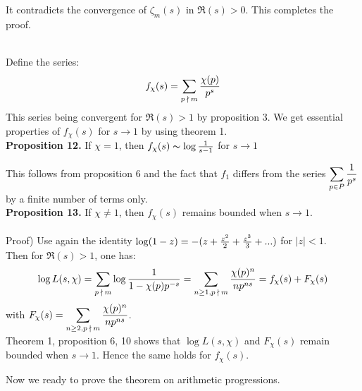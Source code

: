 \documentclass[11pt]{article}
\begin{document}
\noindent It contradicts the convergence of $\zeta_m(s)$ in $\Re(s)>0$. This completes the proof.
\\
\\
\par Define the series:
\begin{equation*}
f_{\chi}(s)=\displaystyle\sum_{p\:\nmid\: m}{\chi(p)\over p^s}
\end{equation*}
This series being convergent for $\Re(s)>1$ by proposition 3. We get essential properties of $f_{\chi}(s)$ for $s\to 1$ by using theorem 1.
\vspace{7mm}
\\
\textbf{Proposition 12.}
If $\chi=1$, then $f_{\chi}(s) \thicksim \log{1\over s-1}$ for $s\to 1$
\\
\par
This follows from proposition 6 and the fact that $f_1$ differs from the series $\displaystyle\sum_{p\in P}{1\over p^s}$ by a finite number of terms only.
\vspace{7mm}
\\
\textbf{Proposition 13.}
If $\chi\neq 1$, then $f_{\chi}(s)$ remains bounded when $s\to 1$.
\\
\\
Proof) Use again the identity $\log(1-z)=-(z+{z^2\over2}+{z^3\over3}+...)$ for $|z|<1$.
\\
Then for $\Re(s)>1$, one has:
\begin{equation*}
\log L(s, \chi)=\displaystyle\sum_{p\:\nmid\: m}\log{1\over 1-\chi(p)p^{-s}}=\displaystyle\sum_{n\geq 1, p\:\nmid\: m}{\chi(p)^n \over np^{ns}}=f_{\chi}(s)+F_{\chi}(s) 
\end{equation*}
with $F_{\chi}(s)=\displaystyle\sum_{n\geq 2, p\:\nmid\: m}{\chi(p)^n \over np^{ns}}$.
\vspace{2mm}
\\
Theorem 1, proposition 6, 10 shows that $\log L(s, \chi)$ and $F_{\chi}(s)$ remain bounded when $s\to 1$. Hence the same holds for $f_{\chi}(s)$.
\vspace{5mm}
\\
\par
Now we ready to prove the theorem on arithmetic progressions.
\newpage
\end{document}
